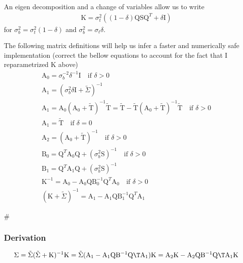 An eigen decomposition and a change of variables allow us to write
\begin{align*}
\mathrm K = \sigma_t^2  ((1-\delta)\mathrm Q \mathrm S \mathrm Q^{T} + \delta \mathrm I)
\end{align*}
for $\sigma_b^2=\sigma_t^2(1-\delta)$ and $\sigma_b^2 = \sigma_t \delta$.

The following matrix definitions will help us infer a faster and numerically safe implementation (correct the bellow equations to account for the fact that I reparametrized K above)
\begin{align*}
\mathrm A_0 = \sigma_b^{-2} \delta^{-1} \mathrm I \quad \text{if }\delta > 0\\
\mathrm A_1 = (\sigma_b^2 \delta \mathrm I + \tilde\Sigma)^{-1}\\
\mathrm A_1 = \mathrm A_0 (\mathrm A_0 + \tilde{\mathrm T})^{-1} \tilde{\mathrm T} = \tilde{\mathrm T} - \tilde{\mathrm T} (\mathrm A_0 + \tilde{\mathrm T})^{-1} \tilde{\mathrm T} \quad \text{if }\delta > 0\\
\mathrm A_1 = \tilde{\mathrm T} \quad \text{if } \delta = 0\\

\mathrm A_2 = (\mathrm A_0 + \tilde{\mathrm T})^{-1} \quad \text{if } \delta > 0\\
\mathrm B_0 = \mathrm Q^T \mathrm A_0 \mathrm Q + (\sigma_b^2 \mathrm S)^{-1} \quad \text{if } \delta > 0\\
\mathrm B_1 = \mathrm Q^T \mathrm A_1 \mathrm Q + (\sigma_b^2 \mathrm S)^{-1}\\
\mathrm K^{-1} = \mathrm A_0 - \mathrm A_0 \mathrm Q \mathrm B_0^{-1} \mathrm Q^T \mathrm A_0 \quad \text{if } \delta > 0\\
(\mathrm K + \tilde{\Sigma})^{-1} = \mathrm A_1 - \mathrm A_1 \mathrm Q\mathrm B_1^{-1} \mathrm Q^T \mathrm A_1
\end{align*}

#\subsubsection{Derivation}

\begin{align*}
\Sigma = \tilde{\Sigma} (\tilde{\Sigma} + \mathrm K)^{-1} \mathrm K = \tilde{\Sigma} (\mathrm A_1 - \mathrm A_1 \mathrm Q \mathrm B^{-1}\mathrm Q\T \mathrm A_1) \mathrm K
= \mathrm A_2 \mathrm K - \mathrm A_2 \mathrm Q
          \mathrm B^{-1}\mathrm Q\T \mathrm A_1 \mathrm K
\end{align*}

